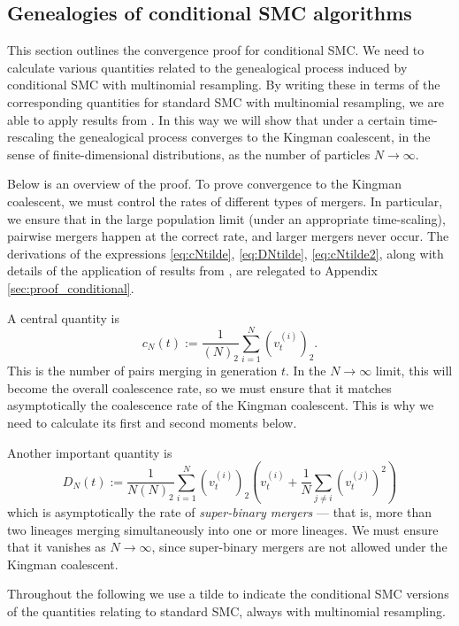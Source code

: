 \documentclass[fleqn]{article}
\theoremstyle{definition}
\newcommand{\vt}[2][t]{v_{#1}^{(#2)}}
\begin{document}
\subsection{Genealogies of conditional SMC algorithms}\label{sec:condSMC_maths}
This section outlines the convergence proof for conditional SMC.
We need to calculate various quantities related to the genealogical process induced by conditional SMC with multinomial resampling. By writing these in terms of the corresponding quantities for standard SMC with multinomial resampling, we are able to apply results from \citet{koskela2018}. In this way we will show that under a certain time-rescaling the genealogical process converges to the Kingman coalescent, in the sense of finite-dimensional distributions, as the number of particles $N\to\infty$.

Below is an overview of the proof.
To prove convergence to the Kingman coalescent, we must control the rates of different types of mergers. In particular, we ensure that in the large population limit (under an appropriate time-scaling), pairwise mergers happen at the correct rate, and larger mergers never occur.
The derivations of the expressions \eqref{eq:cNtilde}, \eqref{eq:DNtilde}, \eqref{eq:cNtilde2}, along with details of the application of results from \citet{koskela2018}, are relegated to Appendix \ref{sec:proof_conditional}. 

A central quantity is
\begin{equation*}
c_N(t) := \frac{1}{(N)_2} \sum_{i=1}^{N} (\vt{i})_2.
\end{equation*}
This is the number of pairs merging in generation $t$. In the $N\to\infty$ limit, this will become the overall coalescence rate, so we must ensure that it matches asymptotically the coalescence rate of the Kingman coalescent. This is why we need to calculate its first and second moments below.

Another important quantity is
\begin{equation*}
D_N(t) := \frac{1}{N(N)_2} \sum_{i=1}^N (\vt{i})_2 \left( \vt{i} + \frac{1}{N} \sum_{j\neq i} (\vt{j})^2 \right)
\end{equation*}
which is asymptotically the rate of \emph{super-binary mergers} --- that is, more than two lineages merging simultaneously into one or more lineages. We must ensure that it vanishes as $N\to\infty$, since super-binary mergers are not allowed under the Kingman coalescent.

Throughout the following we use a tilde to indicate the conditional SMC versions of the quantities relating to standard SMC, always with multinomial resampling.
\end{document}
